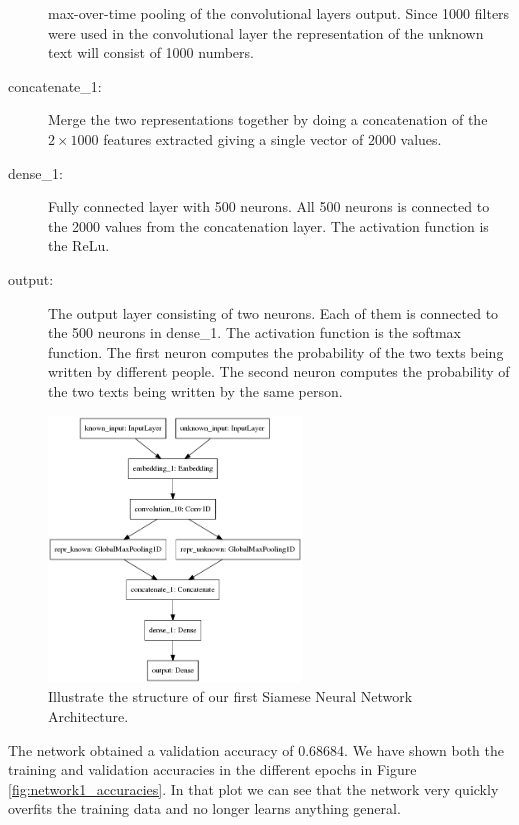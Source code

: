 \begin{description}
        max-over-time pooling of the convolutional layers output. Since 1000
        filters were used in the convolutional layer the representation of the
        unknown text will consist of 1000 numbers.
    \item[concatenate\_1:] Merge the two representations together by doing a
        concatenation of the $2 \times 1000$ features extracted giving a single
        vector of $2000$ values.
    \item[dense\_1:] Fully connected layer with 500 neurons. All 500 neurons is
        connected to the 2000 values from the concatenation layer. The
        activation function is the \gls{ReLu}.
    \item[output:] The output layer consisting of two neurons. Each of them is
        connected to the 500 neurons in dense\_1. The activation function is the
        softmax function. The first neuron computes the probability of the two
        texts being written by different people. The second neuron computes the
        probability of the two texts being written by the same person.
\end{description}

\begin{figure}[htb]
    \centering
    \includegraphics[width=0.6\textwidth]{./pictures/method/network1.png}
    \caption{Illustrate the structure of our first Siamese Neural Network
        Architecture.}
    \label{fig:network_1}
\end{figure}

The network obtained a validation accuracy of 0.68684. We have shown both the
training and validation accuracies in the different epochs in Figure
\ref{fig:network1_accuracies}. In that plot we can see that the network very
quickly overfits the training data and no longer learns anything general.

